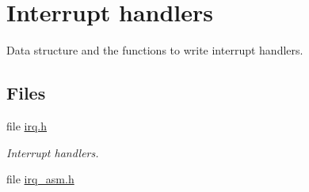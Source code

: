 \hypertarget{group__i386__irq}{}\section{Interrupt handlers}
\label{group__i386__irq}


Data structure and the functions to write interrupt handlers.  


\subsection*{Files}
\begin{DoxyCompactItemize}
\item 
file \mbox{\hyperlink{bsps_2i386_2include_2bsp_2irq_8h}{irq.\+h}}
\begin{DoxyCompactList}\small\item\em Interrupt handlers. \end{DoxyCompactList}\item 
file \mbox{\hyperlink{irq__asm_8h}{irq\+\_\+asm.\+h}}
\end{DoxyCompactItemize}
